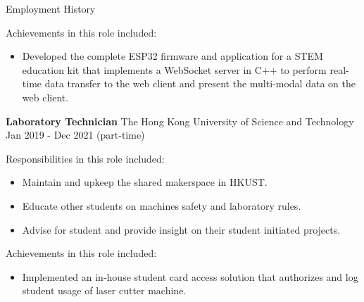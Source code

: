 \documentclass{resume} %
\begin{document}
\begin{rSection}{Employment History}
\begin{minipage}{.8\textwidth}
        Achievements in this role included:
        \begin{itemize}
            \item Developed the complete ESP32 firmware and application for a STEM education kit that implements a WebSocket server in C++ to perform real-time data transfer to the web client and present the multi-modal data on the web client.
        \end{itemize}
    \end{minipage}%
    
    
    \item \textbf{Laboratory Technician} {The Hong Kong University of Science and Technology} \hfill Jan 2019 - Dec 2021 (part-time) \\
    
    \hspace*{1cm}%
    \begin{minipage}{.8\textwidth}%
        
        Responsibilities in this role included:
        \begin{itemize}
            \item Maintain and upkeep the shared makerspace in HKUST.
            \item Educate other students on machines safety and laboratory rules.
            \item Advise for student and provide insight on their student initiated projects.
        \end{itemize}
        
        Achievements in this role included:
        \begin{itemize}
            \item Implemented an in-house student card access solution that authorizes and log student usage of laser cutter machine.
        \end{itemize}
        
    \end{minipage}%
\end{rSection}
\end{document}
